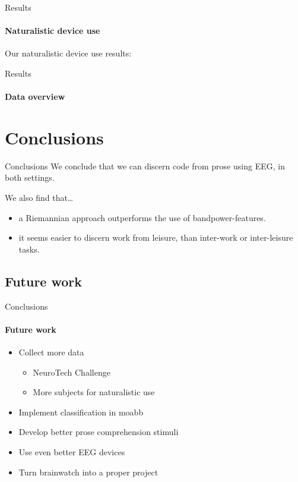 \documentclass[xcolor={dvipsnames,table},12pt]{beamer}
\newif\ifplacelogo{}  %
\begin{document}
\begin{frame}{Results}
    \framesubtitle{Naturalistic device use}
    Our naturalistic device use results:

    \begin{adjustbox}{width=0.8\textwidth, float=table}
        
    \end{adjustbox}
\end{frame}

\placelogofalse{}
\begin{frame}{Results}
    \framesubtitle{Data overview}
    {
        \tiny
        
    }
\end{frame}
\placelogotrue{}

\section{Conclusions}
\begin{frame}{Conclusions}
    We conclude that we can discern code from prose using EEG, in both settings.

    We also find that\ldots
    \begin{itemize}
        \item a Riemannian approach outperforms the use of bandpower-features.
        \item it seems easier to discern work from leisure, than inter-work or inter-leisure tasks.
    \end{itemize}
\end{frame}

\subsection{Future work}
\begin{frame}{Conclusions}
    \framesubtitle{Future work}

    \begin{itemize}
        \item Collect more data
        \begin{itemize}
            \item NeuroTech Challenge
            \item More subjects for naturalistic use
        \end{itemize}
        \item Implement classification in moabb
        \item Develop better prose comprehension stimuli
        \item Use even better EEG devices
        \item Turn brainwatch into a proper project
    \end{itemize}
\end{frame}
\end{document}
